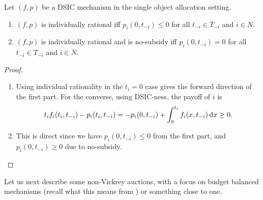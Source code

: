		\begin{flem}
			\label{lem: dsic ir single object}
			Let $(f,p)$ be a DSIC mechanism in the single object allocation setting.
			\begin{enumerate}[label=(\alph*)]
				\item $(f,p)$ is individually rational iff $p_i(0,t_{-i}) \le 0$ for all $t_{-i} \in T_{-i}$ and $i \in N$.
				\item $(f,p)$ is individually rational and is no-subsidy iff $p_i(0,t_{-i}) = 0$ for all $t_{-i} \in T_{-i}$ and $i \in N$.
			\end{enumerate}
		\end{flem}
		\begin{proof}
			\phantom{pain}
			\begin{enumerate}[label=(\alph*)]
				\item Using individual rationality in the $t_i = 0$ case gives the forward direction of the first part. For the converse, using DSIC-ness, the payoff of $i$ is
				\[ t_i f_i(t_i,t_{-i}) - p_i(t_i,t_{-i}) = - p_i(0,t_{-i}) + \int_{0}^{t_i} f_i(x,t_{-i}) \dif x \ge 0. \]
				
				 \item This is direct since we have $p_i(0,t_{-i}) \le 0$ from the first part, and $p_i(0,t_{-i}) \ge 0$ due to no-subsidy. \qedhere
			\end{enumerate}
		\end{proof}

		Let us next describe some non-Vickrey auctions, with a focus on budget balanced mechanisms (recall what this means from ) or something close to one.


